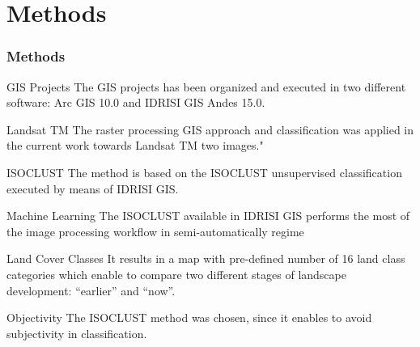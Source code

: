 \documentclass[pdflatex,compress,9pt,
	xcolor={dvipsnames,dvipsnames,svgnames,x11names,table},
	hyperref={colorlinks = true,breaklinks = true, urlcolor = NavyBlue, breaklinks = true}]{beamer}
\begin{document}
\section{Methods}
\begin{frame}\frametitle{Methods}

\begin{block}{GIS Projects}
The GIS projects has been organized and executed in two different software: \alert{Arc GIS 10.0} and \alert{IDRISI GIS Andes 15.0}.
\end{block}

\begin{block}{Landsat TM}
The raster processing GIS approach and classification was applied in the current work towards Landsat TM two images."
\end{block}

\begin{block}{ISOCLUST}
The method is based on the ISOCLUST unsupervised classification executed by means of IDRISI GIS.
\end{block}

\begin{block}{Machine Learning}
The ISOCLUST available in IDRISI GIS performs the most of the image processing workflow in semi-automatically regime
\end{block}

\begin{block}{Land Cover Classes}
It results in a map with pre-defined number of 16 land class categories which enable to compare two different stages of landscape development: \alert{“earlier”} and \alert{“now”}.
\end{block}

\begin{block}{Objectivity}
The ISOCLUST method was chosen, since it enables to avoid subjectivity in classification.
\end{block}

\end{frame}
\end{document}
